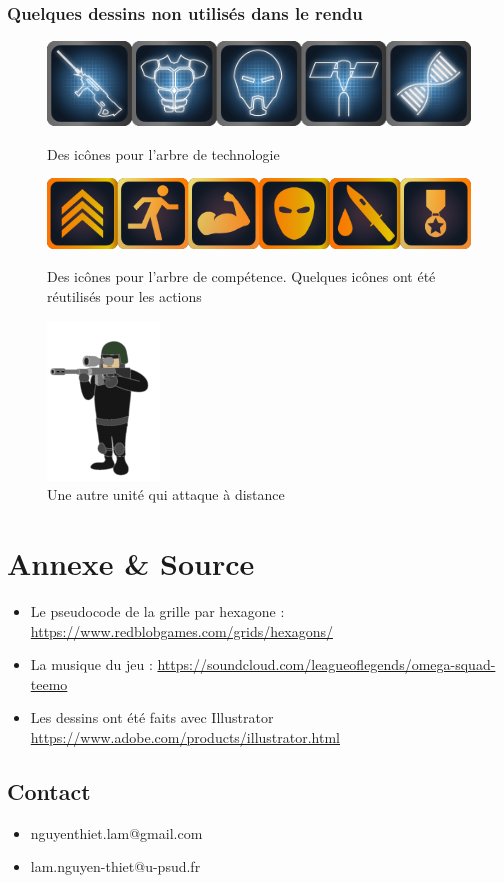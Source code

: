 \documentclass{article}
\begin{document}
\subsubsection{Quelques dessins non utilisés dans le rendu}
    \begin{figure}[H]
        \centering
     \includegraphics[scale=0.5]{asset/image/tech.png}
    \caption{Des icônes pour l'arbre de technologie}
    \vspace{1cm}

     \includegraphics[scale=0.5]{asset/image/skill.png}
    \caption{Des icônes pour l'arbre de compétence. Quelques icônes ont été réutilisés pour les actions}
    \vspace{1cm}

     \includegraphics[scale=0.5]{asset/image/sniper_eu.png}
    \caption{Une autre unité qui attaque à distance}
    \end{figure}

\section{Annexe \& Source}
\begin{itemize}
    \item Le pseudocode de la grille par hexagone : \url{https://www.redblobgames.com/grids/hexagons/}
    \item La musique du jeu : \url{https://soundcloud.com/leagueoflegends/omega-squad-teemo}
    \item Les dessins ont été faits avec Illustrator \url{https://www.adobe.com/products/illustrator.html}
\end{itemize}
\subsection{Contact}
\begin{itemize}
    \item nguyenthiet.lam@gmail.com
    \item lam.nguyen-thiet@u-psud.fr
\end{itemize}
\end{document}
